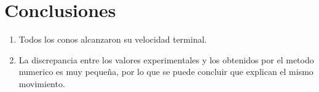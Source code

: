 \section{Conclusiones}

\begin{enumerate}
    \item Todos los conos alcanzaron su velocidad terminal.
    \item La discrepancia entre los valores experimentales y los obtenidos
        por el metodo numerico es muy pequeña, por lo que se puede concluir
        que explican el mismo movimiento.
\end{enumerate}

